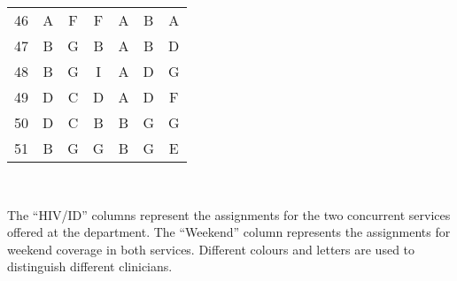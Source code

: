 \begin{table}[htbp]
\begin{adjustbox}{scale=0.8}
\begin{tabular}{c||ccc||ccc}
    	                       46                         & \cellcolor[rgb]{ .663,  .816,  .557}A &               \cellcolor[rgb]{ .557,  .663,  .859}F                &               \cellcolor[rgb]{ .557,  .663,  .859}F                & \cellcolor[rgb]{ .663,  .816,  .557}A &               \cellcolor[rgb]{ .608,  .761,  .902}B                &               \cellcolor[rgb]{ .663,  .816,  .557}A                \\
    	                       47                         & \cellcolor[rgb]{ .608,  .761,  .902}B &                \cellcolor[rgb]{ .518,  .592,  .69}G                &               \cellcolor[rgb]{ .608,  .761,  .902}B                & \cellcolor[rgb]{ .663,  .816,  .557}A &               \cellcolor[rgb]{ .608,  .761,  .902}B                &               \cellcolor[rgb]{ .788,  .788,  .788}D                \\
    	                       48                         & \cellcolor[rgb]{ .608,  .761,  .902}B &                \cellcolor[rgb]{ .518,  .592,  .69}G                & \cellcolor[rgb]{ .251,  .251,  .251}\textcolor[rgb]{ 1,  1,  1}{I} & \cellcolor[rgb]{ .663,  .816,  .557}A &               \cellcolor[rgb]{ .788,  .788,  .788}D                &                \cellcolor[rgb]{ .518,  .592,  .69}G                \\
    	                       49                         & \cellcolor[rgb]{ .788,  .788,  .788}D &                  \cellcolor[rgb]{ 1,  .851,  .4}C                  &               \cellcolor[rgb]{ .788,  .788,  .788}D                & \cellcolor[rgb]{ .663,  .816,  .557}A &               \cellcolor[rgb]{ .788,  .788,  .788}D                &               \cellcolor[rgb]{ .557,  .663,  .859}F                \\
    	                       50                         & \cellcolor[rgb]{ .788,  .788,  .788}D &                  \cellcolor[rgb]{ 1,  .851,  .4}C                  &               \cellcolor[rgb]{ .608,  .761,  .902}B                & \cellcolor[rgb]{ .608,  .761,  .902}B &                \cellcolor[rgb]{ .518,  .592,  .69}G                &                \cellcolor[rgb]{ .518,  .592,  .69}G                \\
    	                       51                         & \cellcolor[rgb]{ .608,  .761,  .902}B &                \cellcolor[rgb]{ .518,  .592,  .69}G                &                \cellcolor[rgb]{ .518,  .592,  .69}G                & \cellcolor[rgb]{ .608,  .761,  .902}B &                \cellcolor[rgb]{ .518,  .592,  .69}G                &                \cellcolor[rgb]{ .957,  .69,  .518}E
    \end{tabular}%
	\end{adjustbox}\\[1em]
	\footnotesize\raggedright
	The ``HIV/ID'' columns represent the assignments for the two concurrent services offered at the department. The ``Weekend'' column represents the assignments for weekend coverage in both services. Different colours and letters are used to distinguish different clinicians.
\end{table}%
